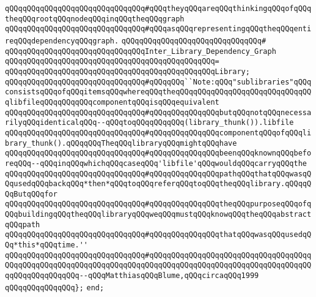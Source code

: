 \verb|qQQqqQQqqQQqqQQqqQQqqQQqqQQqqQQq#qQQqtheyqQQqareqQQqthinkingqQQqofqQQqtheqQQqrootqQQqnodeqQQqinqQQqtheqQQqgraph|\newline
\verb|qQQqqQQqqQQqqQQqqQQqqQQqqQQqqQQq#qQQqasqQQqrepresentingqQQqtheqQQqentireqQQqdependencyqQQqgraph.|\newline
\verb|qQQqqQQqqQQqqQQqqQQqqQQqqQQqqQQq#|\newline
\verb|qQQqqQQqqQQqqQQqqQQqqQQqqQQqqQQqInter_Library_Dependency_Graph|\newline
\verb|qQQqqQQqqQQqqQQqqQQqqQQqqQQqqQQqqQQqqQQqqQQqqQQq=|\newline
\verb|qQQqqQQqqQQqqQQqqQQqqQQqqQQqqQQqqQQqqQQqqQQqqQQqLibrary;|\newline
\newline
\verb|qQQqqQQqqQQqqQQqqQQqqQQqqQQqqQQq#qQQqqQQq``Note:qQQq"sublibraries"qQQqconsistsqQQqofqQQqitemsqQQqwhereqQQqtheqQQqqQQqqQQqqQQqqQQqqQQqqQQqqQQqlibfileqQQqqQQqqQQqcomponentqQQqisqQQqequivalent|\newline
\verb|qQQqqQQqqQQqqQQqqQQqqQQqqQQqqQQq#qQQqqQQqqQQqqQQqbutqQQqnotqQQqnecessarilyqQQqidenticalqQQq--qQQqtoqQQqqQQqqQQq(library_thunk()).libfile|\newline
\verb|qQQqqQQqqQQqqQQqqQQqqQQqqQQqqQQq#qQQqqQQqqQQqqQQqcomponentqQQqofqQQqlibrary_thunk().qQQqqQQqTheqQQqlibraryqQQqmightqQQqhave|\newline
\verb|qQQqqQQqqQQqqQQqqQQqqQQqqQQqqQQq#qQQqqQQqqQQqqQQqbeenqQQqknownqQQqbeforeqQQq--qQQqinqQQqwhichqQQqcaseqQQq'libfile'qQQqwouldqQQqcarryqQQqthe|\newline
\verb|qQQqqQQqqQQqqQQqqQQqqQQqqQQqqQQq#qQQqqQQqqQQqqQQqpathqQQqthatqQQqwasqQQqusedqQQqbackqQQq*then*qQQqtoqQQqreferqQQqtoqQQqtheqQQqlibrary.qQQqqQQqButqQQqfor|\newline
\verb|qQQqqQQqqQQqqQQqqQQqqQQqqQQqqQQq#qQQqqQQqqQQqqQQqtheqQQqpurposeqQQqofqQQqbuildingqQQqtheqQQqlibraryqQQqweqQQqmustqQQqknowqQQqtheqQQqabstractqQQqpath|\newline
\verb|qQQqqQQqqQQqqQQqqQQqqQQqqQQqqQQq#qQQqqQQqqQQqqQQqthatqQQqwasqQQqusedqQQq*this*qQQqtime.''|\newline
\verb|qQQqqQQqqQQqqQQqqQQqqQQqqQQqqQQq#qQQqqQQqqQQqqQQqqQQqqQQqqQQqqQQqqQQqqQQqqQQqqQQqqQQqqQQqqQQqqQQqqQQqqQQqqQQqqQQqqQQqqQQqqQQqqQQqqQQqqQQqqQQqqQQqqQQqqQQqqQQq--qQQqMatthiasqQQqBlume,qQQqcircaqQQq1999|\newline
\newline
\verb|qQQqqQQqqQQqqQQq};|\newline
\verb|end;|\newline
\newline
